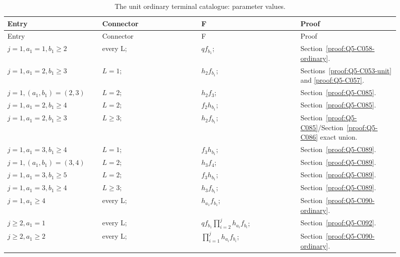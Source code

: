 \begingroup\small
\setlength{\tabcolsep}{3pt}
\setlength{\LTleft}{0pt}\setlength{\LTright}{\fill}
\begin{longtable}{@{}p{0.2200\linewidth}p{0.2333\linewidth}p{0.2333\linewidth}p{0.2333\linewidth}@{}}
\caption{The unit ordinary terminal catalogue: parameter values.}\label{tab:parameters:q5-c106:1}\\
\toprule
Entry & Connector & F & Proof \\
\midrule\endfirsthead
\toprule
Entry & Connector & F & Proof \\
\midrule\endhead
\bottomrule\endfoot
\(j=1,\allowbreak  a_1=1,\allowbreak  b_1\ge 2\) & every L; & \(q f_{b_1}\); & Section~\ref{proof:Q5-C058-ordinary}. \\
\addlinespace[2pt]
\(j=1,\allowbreak  a_1=2,\allowbreak  b_1\ge 3\) & \(L=1\); & \(h_2 f_{b_1}\); & Sections~\ref{proof:Q5-C053-unit} and \ref{proof:Q5-C057}. \\
\addlinespace[2pt]
\(j=1,\allowbreak  (a_1,\allowbreak b_1)=(2,\allowbreak 3)\) & \(L=2\); & \(h_2 f_3\); & Section~\ref{proof:Q5-C085}. \\
\addlinespace[2pt]
\(j=1,\allowbreak  a_1=2,\allowbreak  b_1\ge 4\) & \(L=2\); & \(f_2 h_{b_1}\); & Section~\ref{proof:Q5-C085}. \\
\addlinespace[2pt]
\(j=1,\allowbreak  a_1=2,\allowbreak  b_1\ge 3\) & \(L\ge 3\); & \(h_2 f_{b_1}\); & Section~\ref{proof:Q5-C085}/Section~\ref{proof:Q5-C086} exact union. \\
\addlinespace[2pt]
\(j=1,\allowbreak  a_1=3,\allowbreak  b_1\ge 4\) & \(L=1\); & \(f_3 h_{b_1}\); & Section~\ref{proof:Q5-C089}. \\
\addlinespace[2pt]
\(j=1,\allowbreak  (a_1,\allowbreak b_1)=(3,\allowbreak 4)\) & \(L=2\); & \(h_3 f_4\); & Section~\ref{proof:Q5-C089}. \\
\addlinespace[2pt]
\(j=1,\allowbreak  a_1=3,\allowbreak  b_1\ge 5\) & \(L=2\); & \(f_3 h_{b_1}\); & Section~\ref{proof:Q5-C089}. \\
\addlinespace[2pt]
\(j=1,\allowbreak  a_1=3,\allowbreak  b_1\ge 4\) & \(L\ge 3\); & \(h_3 f_{b_1}\); & Section~\ref{proof:Q5-C089}. \\
\addlinespace[2pt]
\(j=1,\allowbreak  a_1\ge 4\) & every L; & \(h_{a_1}f_{b_1}\); & Section~\ref{proof:Q5-C090-ordinary}. \\
\addlinespace[2pt]
\(j\ge 2,\allowbreak  a_1=1\) & every L; & \(q f_{b_1} \prod_{i=2}^j h_{a_i}f_{b_i}\); & Section~\ref{proof:Q5-C092}. \\
\addlinespace[2pt]
\(j\ge 2,\allowbreak  a_1\ge 2\) & every L; & \(\prod_{i=1}^j h_{a_i}f_{b_i}\); & Section~\ref{proof:Q5-C090-ordinary}. \\
\end{longtable}
\endgroup


